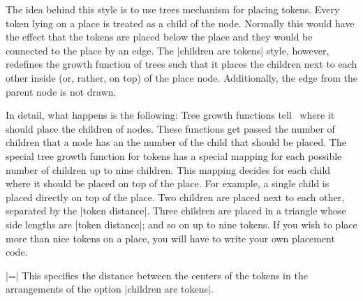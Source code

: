\begin{itemize}
  The idea behind this style is to use trees mechanism for placing
  tokens. Every token lying on a place is treated as a child of the
  node. Normally this would have the effect that the tokens are placed
  below the place and they would be connected to the place by an
  edge. The |children are tokens| style, however, redefines the growth
  function of trees such that it places the children next to each
  other inside (or, rather, on top) of the place node. Additionally,
  the edge from the parent node is not drawn.
\begin{codeexample}[]
\end{codeexample}

  In detail, what happens is the following: Tree growth functions tell
  \tikzname\ where it should place the children of nodes. These
  functions get passed the number of children that a node has an the
  number of the child that should be placed. The special tree growth
  function for tokens has a special mapping for each possible number
  of children up to nine children. This mapping decides for each child
  where it should be placed on top of the place. For example, a single
  child is placed directly on top of the place. Two children are
  placed next to each other, separated by the |token distance|. Three
  children are placed in a triangle whose side lengths are
  |token distance|; and so on up to nine tokens. If you wish to place
  more than nice tokens on a place, you will have to write your own
  placement code.
\begin{codeexample}[]
\end{codeexample}

  |=|
  This specifies the distance between the centers of the tokens in the
  arrangements of the option |children are tokens|.
\begin{codeexample}[]
\end{codeexample}
\end{itemize}

